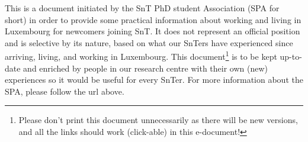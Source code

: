 This is a document initiated by the SnT PhD student Association (SPA for short) in order to provide some practical information about working and living in Luxembourg for newcomers joining SnT. It does not represent an official position and is selective by its nature, based on what our SnTers have experienced since arriving, living, and working in Luxembourg. This document\footnote{Please don't print this document unnecessarily as there will be new versions, and all the links should work (click-able) in this e-document!} is to be kept up-to-date and enriched by people in our research centre with their own (new) experiences so it would be useful for every SnTer. 
For more information about the SPA, please follow the url above. 